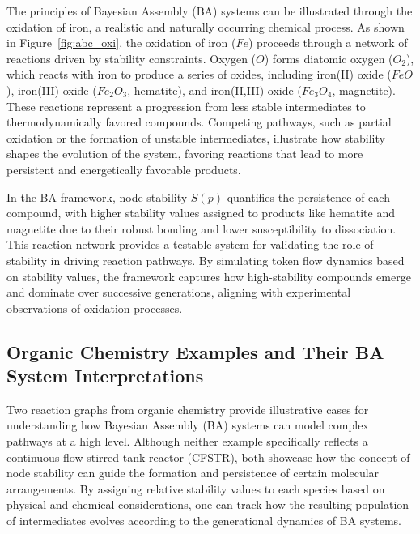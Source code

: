 \documentclass[entropy,article,submit,pdftex,moreauthors]{Definitions/mdpi}
\begin{document}
The principles of Bayesian Assembly (BA) systems can be illustrated through the oxidation of iron, a realistic and naturally occurring chemical process. As shown in Figure~\ref{fig:abc_oxi}, the oxidation of iron (\(Fe\)) proceeds through a network of reactions driven by stability constraints. Oxygen (\(O\)) forms diatomic oxygen (\(O_2\)), which reacts with iron to produce a series of oxides, including iron(II) oxide (\(FeO\)), iron(III) oxide (\(Fe_2O_3\), hematite), and iron(II,III) oxide (\(Fe_3O_4\), magnetite). These reactions represent a progression from less stable intermediates to thermodynamically favored compounds. Competing pathways, such as partial oxidation or the formation of unstable intermediates, illustrate how stability shapes the evolution of the system, favoring reactions that lead to more persistent and energetically favorable products.

In the BA framework, node stability \(S(p)\) quantifies the persistence of each compound, with higher stability values assigned to products like hematite and magnetite due to their robust bonding and lower susceptibility to dissociation. This reaction network provides a testable system for validating the role of stability in driving reaction pathways. By simulating token flow dynamics based on stability values, the framework captures how high-stability compounds emerge and dominate over successive generations, aligning with experimental observations of oxidation processes.


\subsection{Organic Chemistry Examples and Their BA System Interpretations}
\label{sec:organic-ba-examples}

Two reaction graphs from organic chemistry provide illustrative cases for understanding how Bayesian Assembly (BA) systems can model complex pathways at a high level. Although neither example specifically reflects a continuous-flow stirred tank reactor (CFSTR), both showcase how the concept of node stability can guide the formation and persistence of certain molecular arrangements. By assigning relative stability values to each species based on physical and chemical considerations, one can track how the resulting population of intermediates evolves according to the generational dynamics of BA systems.
\end{document}
